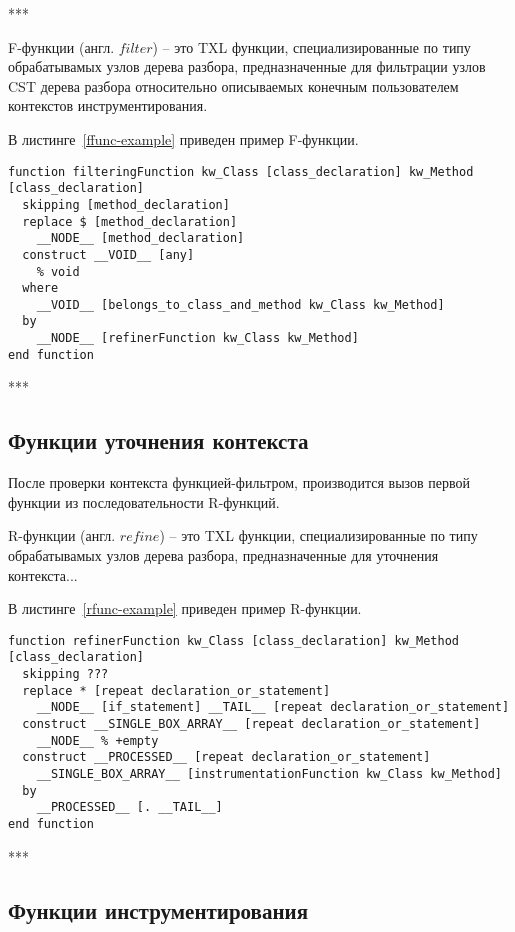 ***

F-функции (англ. $filter$) -- это TXL функции, специализированные по типу обрабатывамых узлов дерева разбора, предназначенные для фильтрации узлов CST дерева разбора относительно описываемых конечным пользователем контекстов инструментирования.

В листинге~\ref{ffunc-example} приведен пример F-функции.

\begin{lstlisting}[language=TXL, label={ffunc-example}, caption={Пример F-функции}]
function filteringFunction kw_Class [class_declaration] kw_Method [class_declaration]
  skipping [method_declaration]
  replace $ [method_declaration]
    __NODE__ [method_declaration]
  construct __VOID__ [any]
    % void
  where
    __VOID__ [belongs_to_class_and_method kw_Class kw_Method]
  by
    __NODE__ [refinerFunction kw_Class kw_Method]
end function
\end{lstlisting}

***

\subsection{Функции уточнения контекста}

После проверки контекста функцией-фильтром, производится вызов первой функции из последовательности R-функций.

R-функции (англ. $refine$) -- это TXL функции, специализированные по типу обрабатывамых узлов дерева разбора, предназначенные для уточнения контекста...

В листинге~\ref{rfunc-example} приведен пример R-функции.

\begin{lstlisting}[frame=single, language=TXL, label={rfunc-example}, caption={Пример R-функции}]
function refinerFunction kw_Class [class_declaration] kw_Method [class_declaration]
  skipping ???
  replace * [repeat declaration_or_statement]
    __NODE__ [if_statement] __TAIL__ [repeat declaration_or_statement]
  construct __SINGLE_BOX_ARRAY__ [repeat declaration_or_statement]
    __NODE__ % +empty
  construct __PROCESSED__ [repeat declaration_or_statement]
    __SINGLE_BOX_ARRAY__ [instrumentationFunction kw_Class kw_Method]
  by
    __PROCESSED__ [. __TAIL__]
end function
\end{lstlisting}

***

\subsection{Функции инструментирования}

